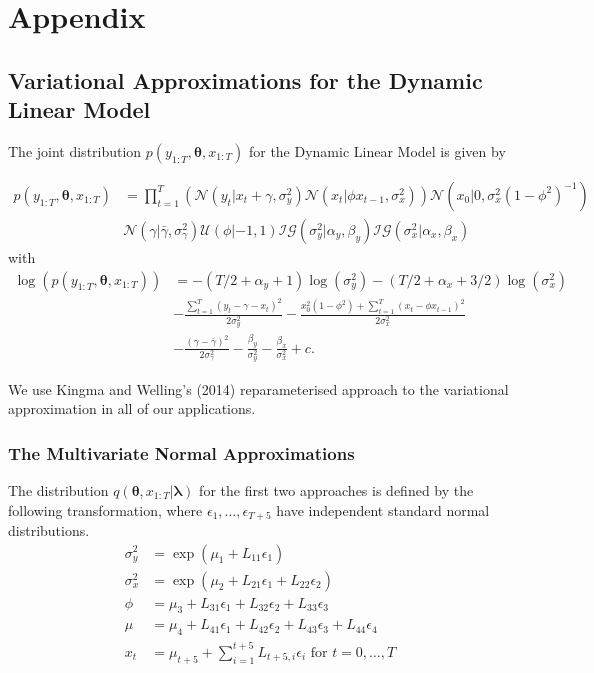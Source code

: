 \documentclass[12pt,a4paper]{article}%
\numberwithin{equation}{section}
\begin{document}
\section{Appendix}

\subsection{Variational Approximations for the Dynamic Linear Model}

The joint distribution $p(y_{1:T}, \boldsymbol{\theta}, x_{1:T})$ for the Dynamic Linear Model is given by

\begin{align}
p(y_{1:T}, \boldsymbol{\theta}, x_{1:T}) &= \prod_{t=1}^{T} \left( \mathcal{N}(y_t | x_t + \gamma, \sigma^2_y) \mathcal{N}(x_t | \phi x_{t-1}, \sigma^2_x) \right) \mathcal{N}(x_0 | 0, \sigma^2_x (1 - \phi^2)^{-1}) \nonumber \\
&\mathcal{N}(\gamma | \bar{\gamma}, \sigma^2_{\gamma}) \mathcal{U}(\phi | -1, 1) \mathcal{IG}(\sigma^2_y | \alpha_y, \beta_y)\mathcal{IG}(\sigma^2_x | \alpha_x, \beta_x) 
\end{align}
with 
\begin{align}
\log(p(y_{1:T}, \boldsymbol{\theta}, x_{1:T})) &= -(T/2 + \alpha_y + 1) \log(\sigma_y^2) -(T/2 + \alpha_x + 3/2) \log(\sigma_x^2) \nonumber \\
&- \frac{\sum_{t=1}^{T}(y_t - \gamma - x_t)^2}{2 \sigma^2_y} - \frac{x_0^2(1 -\phi^2) + \sum_{t=1}^{T}(x_t - \phi x_{t-1})^2}{2 \sigma^2_x} \nonumber \\
&- \frac{(\gamma - \bar{\gamma})^2}{2 \sigma^2_{\gamma}} - \frac{\beta_y}{\sigma^2_y} - \frac{\beta_x}{\sigma^2_x} + c \label{logjoint}. 
\end{align}

We use Kingma and Welling's (2014) reparameterised approach to the variational approximation in all of our applications.

\subsubsection{The Multivariate Normal Approximations}

The distribution $q(\boldsymbol{\theta}, x_{1:T} | \boldsymbol{\lambda})$ for the first two approaches is defined by the following transformation, where $\epsilon_{1}, \dots, \epsilon_{T+5}$ have independent standard normal distributions.
\begin{align}
\sigma^2_y &= \exp(\mu_1 + L_{11} \epsilon_1)  \label{transform1} \\
\sigma^2_x &= \exp(\mu_2 + L_{21} \epsilon_1 + L_{22} \epsilon_2) \label{transform2} \\
\phi &= \mu_3 + L_{31} \epsilon_1 + L_{32} \epsilon_2 + L_{33} \epsilon_3 \label{transform3} \\
\mu &= \mu_4 + L_{41} \epsilon_1 + L_{42} \epsilon_2 + L_{43} \epsilon_3 + L_{44} \epsilon_4 \label{transform4} \\
x_t &= \mu_{t+5} + \sum_{i=1}^{t+5} L_{t+5, i} \epsilon_i \mbox{ for } t = 0, \dots, T \label{transform5} 
\end{align}
\end{document}
